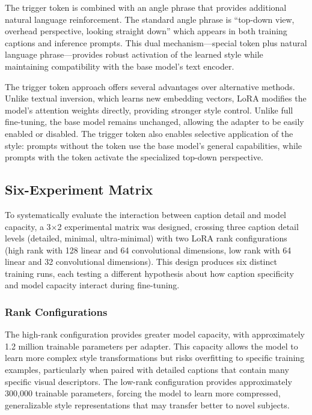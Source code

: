 \documentclass[conference]{IEEEtran}
\begin{document}
The trigger token is combined with an angle phrase that provides additional natural language reinforcement. The standard angle phrase is ``top-down view, overhead perspective, looking straight down'' which appears in both training captions and inference prompts. This dual mechanism---special token plus natural language phrase---provides robust activation of the learned style while maintaining compatibility with the base model's text encoder.

The trigger token approach offers several advantages over alternative methods. Unlike textual inversion, which learns new embedding vectors, LoRA modifies the model's attention weights directly, providing stronger style control. Unlike full fine-tuning, the base model remains unchanged, allowing the adapter to be easily enabled or disabled. The trigger token also enables selective application of the style: prompts without the token use the base model's general capabilities, while prompts with the token activate the specialized top-down perspective.

\subsection{Six-Experiment Matrix}


To systematically evaluate the interaction between caption detail and model capacity, a 3$\times$2 experimental matrix was designed, crossing three caption detail levels (detailed, minimal, ultra-minimal) with two LoRA rank configurations (high rank with 128 linear and 64 convolutional dimensions, low rank with 64 linear and 32 convolutional dimensions). This design produces six distinct training runs, each testing a different hypothesis about how caption specificity and model capacity interact during fine-tuning.

\subsubsection{Rank Configurations}

The high-rank configuration provides greater model capacity, with approximately 1.2 million trainable parameters per adapter. This capacity allows the model to learn more complex style transformations but risks overfitting to specific training examples, particularly when paired with detailed captions that contain many specific visual descriptors. The low-rank configuration provides approximately 300,000 trainable parameters, forcing the model to learn more compressed, generalizable style representations that may transfer better to novel subjects.
\end{document}
